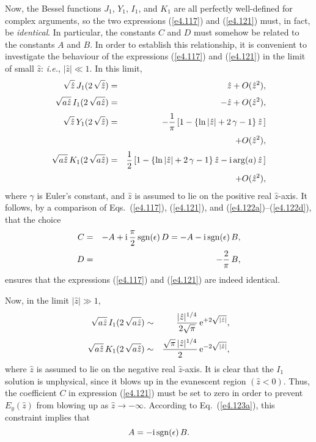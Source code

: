 Now, the Bessel functions $J_1$, $Y_1$, $I_1$, and $K_1$ are all  perfectly 
well-defined for
complex arguments, so the two expressions (\ref{e4.117}) and (\ref{e4.121}) must, in fact,  be 
{\em identical}.
In particular, the constants $C$ and $D$ must somehow be related to the
constants $A$ and $B$. In order to establish this relationship, it
is convenient to investigate the behaviour of the expressions
(\ref{e4.117}) and (\ref{e4.121}) in the limit of small $\hat{z}$: {\em i.e.}, $|\hat{z}|\ll 1$.
In this limit, 
\begin{eqnarray}\label{e4.122a}
\sqrt{\hat{z}}\,J_1(2\,\sqrt{\hat{z}})&=& \hat{z} + O(\hat{z}^2),\\[0.5ex]
\sqrt{a\hat{z}} \,I_1(2\,\sqrt{a\hat{z}}) &=& - \hat{z} + O(\hat{z}^2),\\[0.5ex]
\sqrt{\hat{z}}\,Y_1(2\,\sqrt{\hat{z}}) &=& -\frac{1}{\pi}\left[
1 -\left\{ \ln|\hat{z}| + 2\,\gamma-1\right\}\hat{z}\,\right]\nonumber\\[0.5ex]
&&+ O(\hat{z}^2),\\[0.5ex]
\sqrt{a\hat{z}}\,K_1(2\,\sqrt{a\hat{z}}) &=& \frac{1}{2}\left[
1 -\left\{ \ln|\hat{z}| + 2\,\gamma-1\right\}\hat{z} - {\rm i}\,{\rm arg}(a)\,
\hat{z}\,\right]
\nonumber\\[0.5ex]&&
+ O(\hat{z}^2),\label{e4.122d}
\end{eqnarray}
where $\gamma$ is Euler's constant, and $\hat{z}$ is assumed to lie on the positive
real $\hat{z}$-axis. It follows, by a comparison of Eqs.~(\ref{e4.117}), (\ref{e4.121}), 
and (\ref{e4.122a})--(\ref{e4.122d}), that the choice
\begin{eqnarray}\label{e4.123a}
C&=& -A +{\rm i}\,\frac{\pi}{2}\,{\rm sgn}(\epsilon)\,D = -A - {\rm i}\,
{\rm sgn}(\epsilon)\,B,\\[0.5ex]
D &=& - \frac{2}{\pi}\,B,
\end{eqnarray}
ensures that the expressions (\ref{e4.117}) and (\ref{e4.121}) are indeed identical.

Now, in the limit $|\hat{z}|\gg 1$,
\begin{eqnarray}
\sqrt{a\hat{z}}\,I_1(2\,\sqrt{a\hat{z}}) &\sim & 
\frac{|\hat{z}|^{1/4}}{2\sqrt{\pi}}\,
{\rm e}^{+2\sqrt{|\hat{z}|}},\\[0.5ex]
\sqrt{a\hat{z}}\,K_1(2\,\sqrt{a\hat{z}}) &\sim & 
\frac{\sqrt{\pi}\,|\hat{z}|^{1/4}}{2}\,
{\rm e}^{-2\sqrt{|\hat{z}|}},
\end{eqnarray}
where $\hat{z}$ is assumed to lie on the negative real $\hat{z}$-axis. 
It is clear that the $I_1$ solution is unphysical, since it blows up
in the evanescent region $(\hat{z}<0)$. Thus, the coefficient $C$ in expression
(\ref{e4.121}) must be set to zero in order to prevent $E_y(\hat{z})$ from
blowing up as $\hat{z}\rightarrow -\infty$. According to Eq.~(\ref{e4.123a}),
this constraint implies that
\begin{equation}\label{e4.125}
A = -{\rm i}\,{\rm sgn}(\epsilon)\,B.
\end{equation}
 
